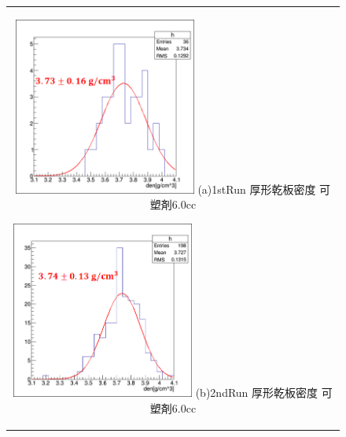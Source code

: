 \documentclass[12pt,a4paper]{jarticle}
\begin{document}
\begin{figure}[htbp]
    \begin{center}
      \begin{tabular}{c}
        \begin{minipage}{0.5\hsize}
          \begin{center}
            \includegraphics[clip, width=60mm]{1stRun_thin_den.png}
            \hspace{1.6cm} (a)1stRun 厚形乾板密度 可塑剤6.0cc
          \end{center}
        \end{minipage}
        
        \begin{minipage}{0.5\hsize}
          \begin{center}
            \includegraphics[clip, width=60mm]{2ndRun_thin_den.png}
            \hspace{1.6cm} (b)2ndRun 厚形乾板密度 可塑剤6.0cc
          \end{center}
        \end{minipage}\\


\end{tabular}
\end{center}
\end{figure}
\end{document}
